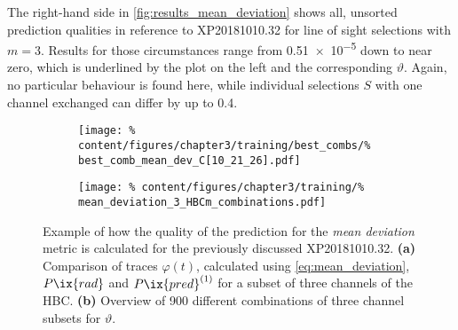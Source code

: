                 The right-hand side in \cref{fig:results_mean_deviation} shows all, unsorted prediction qualities in reference to XP20181010.32 for line of sight selections with $m=3$. Results for those circumstances range from \SI{0.51e-5}{\arbitraryunit} down to near zero, which is underlined by the plot on the left and the corresponding $\vartheta$. Again, no particular behaviour is found here, while individual selections $S$ with one channel exchanged can differ by up to \SI{0.4}{\arbitraryunit}.\\%
%
                \begin{figure}[t]%
                    \centering%
                    \begin{subfigure}{0.47\textwidth}%
                        \texttt{[image: \%
                            content/figures/chapter3/training/best\_combs/\%
                            best\_comb\_mean\_dev\_C[10\_21\_26].pdf]}%
                        \caption{}%
                    \end{subfigure}%
                    \hfill%
                    \begin{subfigure}{0.47\textwidth}%
                        \texttt{[image: \%
                            content/figures/chapter3/training/\%
                            mean\_deviation\_3\_HBCm\_combinations.pdf]}%
                        \caption{}%
                    \end{subfigure}%
                    \caption{Example of how the quality of the prediction for the \textit{mean deviation} metric is calculated for the previously discussed XP20181010.32. \textbf{(a)} Comparison of traces $\varphi\left(t\right)$, calculated using \cref{eq:mean_deviation}, $P\ix{rad}$ and $P\ix{pred}^{\left(1\right)}$ for a subset of three channels of the HBC. \textbf{(b)} Overview of 900 different combinations of three channel subsets for $\vartheta$.}\label{fig:mean_deviation}%
                \end{figure}%
%
